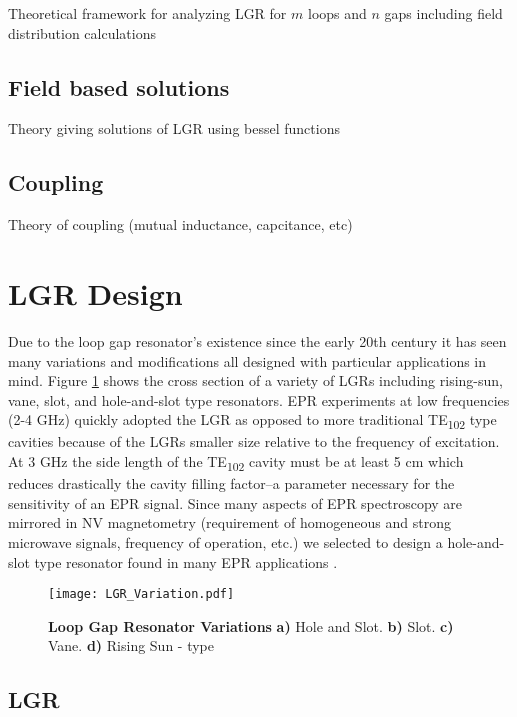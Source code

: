 Theoretical framework for analyzing LGR for $m$ loops and $n$ gaps including field distribution calculations

\subsection{Field based solutions}

Theory giving solutions of LGR using bessel functions

\subsection{Coupling} \label{coupling}

Theory of coupling (mutual inductance, capcitance, etc)

\section{LGR Design}

Due to the loop gap resonator's existence since the early 20th century \cite{collins1948microwave} it has seen many variations and modifications all designed with particular applications in mind. Figure \ref{LGR_variation} shows the cross section of a variety of LGRs including rising-sun, vane, slot, and hole-and-slot type resonators. EPR experiments at low frequencies (2-4 GHz) quickly adopted the LGR as opposed to more traditional TE\textsubscript{102} type cavities because of the LGRs smaller size relative to the frequency of excitation. At 3 GHz the side length of the TE\textsubscript{102} cavity must be at least 5 cm which reduces drastically the cavity filling factor--a parameter necessary for the sensitivity of an EPR signal. Since many aspects of EPR spectroscopy are mirrored in NV magnetometry (requirement of homogeneous and strong microwave signals, frequency of operation, etc.) we selected to design a hole-and-slot type resonator found in many EPR applications \cite{}.  
\vspace{5mm}
\begin{figure}[h!]
\centering
\texttt{[image: LGR\_Variation.pdf]}  
\caption{\textbf{Loop Gap Resonator Variations} \textbf{a)} Hole and Slot. \textbf{b)} Slot. \textbf{c)} Vane. \textbf{d)} Rising Sun - type}
\label{LGR_variation}
\end{figure}


\subsection{LGR}

